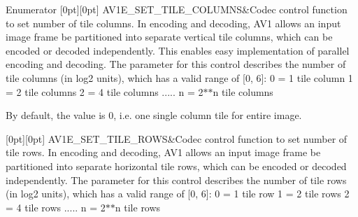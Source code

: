 \begin{DoxyEnumFields}{Enumerator}
[0pt][0pt]{}\mbox{\label{group__aom__encoder_ggae78dde67a6d78f332e9bdba0dde42db5acf4ab1ff2fa8d76a78881ad7f1a1294d}} 
A\+V1\+E\+\_\+\+S\+E\+T\+\_\+\+T\+I\+L\+E\+\_\+\+C\+O\+L\+U\+M\+NS&Codec control function to set number of tile columns. In encoding and decoding, A\+V1 allows an input image frame be partitioned into separate vertical tile columns, which can be encoded or decoded independently. This enables easy implementation of parallel encoding and decoding. The parameter for this control describes the number of tile columns (in log2 units), which has a valid range of \mbox{[}0, 6\mbox{]}\+: 0 = 1 tile column 1 = 2 tile columns 2 = 4 tile columns ..... n = 2$\ast$$\ast$n tile columns

By default, the value is 0, i.\+e. one single column tile for entire image. \\
\hline

[0pt][0pt]{}\mbox{\label{group__aom__encoder_ggae78dde67a6d78f332e9bdba0dde42db5a57f2f2a54f593b398a5e97db7982f817}} 
A\+V1\+E\+\_\+\+S\+E\+T\+\_\+\+T\+I\+L\+E\+\_\+\+R\+O\+WS&Codec control function to set number of tile rows. In encoding and decoding, A\+V1 allows an input image frame be partitioned into separate horizontal tile rows, which can be encoded or decoded independently. The parameter for this control describes the number of tile rows (in log2 units), which has a valid range of \mbox{[}0, 6\mbox{]}\+: 0 = 1 tile row 1 = 2 tile rows 2 = 4 tile rows ..... n = 2$\ast$$\ast$n tile rows


\end{DoxyEnumFields}

